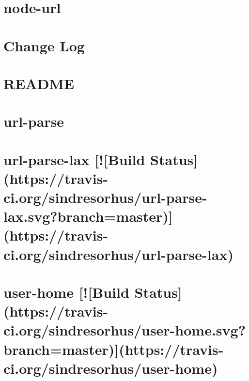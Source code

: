 \documentclass[twoside]{book}
\newcommand{\+}{\discretionary{\mbox{\scriptsize$\hookleftarrow$}}{}{}}
\begin{document}
\chapter{node-\/url}
\label{md__c_1_workspace_demo_src_main_script_node_modules_url__r_e_a_d_m_e}

\chapter{Change Log}
\label{md__c_1_workspace_demo_src_main_script_node_modules_url-loader__c_h_a_n_g_e_l_o_g}

\chapter{R\+E\+A\+D\+ME}
\label{md__c_1_workspace_demo_src_main_script_node_modules_url-loader__r_e_a_d_m_e}

\chapter{url-\/parse}
\label{md__c_1_workspace_demo_src_main_script_node_modules_url-parse__r_e_a_d_m_e}

\chapter{url-\/parse-\/lax \mbox{[}!\mbox{[}Build Status\mbox{]}(https\+://travis-\/ci.org/sindresorhus/url-\/parse-\/lax.svg?branch=master)\mbox{]}(https\+://travis-\/ci.org/sindresorhus/url-\/parse-\/lax)}
\label{md__c_1_workspace_demo_src_main_script_node_modules_url-parse-lax_readme}

\chapter{user-\/home \mbox{[}!\mbox{[}Build Status\mbox{]}(https\+://travis-\/ci.org/sindresorhus/user-\/home.svg?branch=master)\mbox{]}(https\+://travis-\/ci.org/sindresorhus/user-\/home)}
\label{md__c_1_workspace_demo_src_main_script_node_modules_user-home_readme}

\end{document}
